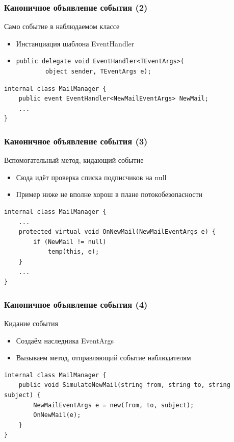 \documentclass{../../slides-style}
\begin{document}
    \begin{frame}[fragile]
        \frametitle{Каноничное объявление события (2)}
        Само событие в наблюдаемом классе
        \begin{itemize}
            \item Инстанциация шаблона EventHandler
            \item 
                \begin{verbatim}
public delegate void EventHandler<TEventArgs>(
        object sender, TEventArgs e);
                \end{verbatim}
        \end{itemize}

        \vspace{7mm}
        \begin{verbatim}
internal class MailManager {
    public event EventHandler<NewMailEventArgs> NewMail;
    ...
}
        \end{verbatim}
    \end{frame}

    \begin{frame}[fragile]
        \frametitle{Каноничное объявление события (3)}
        Вспомогательный метод, кидающий событие
        \begin{itemize}
            \item Сюда идёт проверка списка подписчиков на null
            \item Пример ниже не вполне хорош в плане потокобезопасности
        \end{itemize}
        \vspace{5mm}
        \begin{verbatim}
internal class MailManager {
    ...
    protected virtual void OnNewMail(NewMailEventArgs e) {
        if (NewMail != null) 
            temp(this, e);
    }
    ...
}
        \end{verbatim}
    \end{frame}

    \begin{frame}[fragile]
        \frametitle{Каноничное объявление события (4)}
        Кидание события
        \begin{itemize}
            \item Создаём наследника EventArgs
            \item Вызываем метод, отправляющий событие наблюдателям
        \end{itemize}
        \vspace{5mm}
        \begin{verbatim}
internal class MailManager {
    public void SimulateNewMail(string from, string to, string subject) {
        NewMailEventArgs e = new(from, to, subject);
        OnNewMail(e);
    }
}
        \end{verbatim}
    \end{frame}
\end{document}
